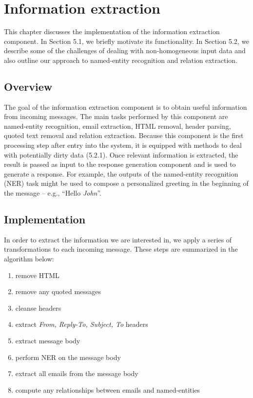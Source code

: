 \chapter{Information extraction}
This chapter discusses the implementation of the information extraction component. In Section 5.1, we briefly motivate its functionality. In Section 5.2, we describe some of the challenges of dealing with non-homogeneous input data and also outline our approach to named-entity recognition and relation extraction. 

\section{Overview}
The goal of the information extraction component is to obtain useful information from incoming messages. The main tasks performed by this component are named-entity recognition, email extraction, HTML removal, header parsing, quoted text removal and relation extraction. Because this component is the first processing step after entry into the system, it is equipped with methods to deal with potentially dirty data (5.2.1). Once relevant information is extracted, the result is passed as input to the response generation component and is used to generate a response. For example, the outputs of the named-entity recognition (NER) task might be used to compose a personalized greeting in the beginning of the message -- e.g., ``Hello \emph{John}''.

\section{Implementation}
In order to extract the information we are interested in, we apply a series of transformations to each incoming message. These steps are summarized in the algorithm below:
\begin{enumerate}
\item remove HTML %
\vspace{-5mm}
\item remove any quoted messages %
\vspace{-5mm}
\item cleanse headers %
\vspace{-5mm}
\item extract \textit{From, Reply-To, Subject, To} headers %
\vspace{-5mm}
\item extract message body %
\vspace{-5mm}
\item perform NER on the message body %
\vspace{-5mm}
\item extract all emails from the message body %
\vspace{-5mm}
\item compute any relationships between emails and named-entities %
\end{enumerate}

